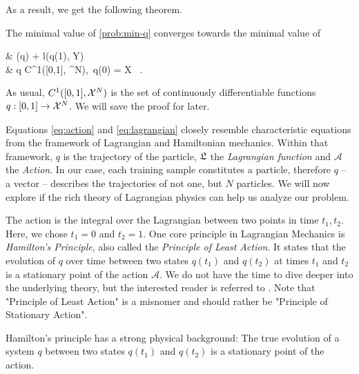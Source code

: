 As a result, we get the following theorem.
\begin{theorem}
	The minimal value of \cref{prob:min-q} converges towards the minimal value of             
	\begin{problem}
	\label{prob:cont-least-action}
		\begin{cases}
			 & \nu {}(q) + l(q(1), Y)\\
			 & q \in C^1([0,1], \cX^N),\ q(0) = X \ .
		\end{cases}
	\end{problem}
\end{theorem}
As usual, $C^1([0,1], \mathcal{X}^N)$ is the set of continuously differentiable functions $q: [0, 1] \rightarrow \mathcal{X}^N$.
We will save the proof for later.

Equations \ref{eq:action} and \ref{eq:lagrangian} closely resemble characteristic equations from the framework of Lagrangian and Hamiltonian mechanics.
Within that framework, $q$ is the trajectory of the particle, $\mathfrak{L}$ the \emph{Lagrangian function} and $\mathcal{A}$ the \emph{Action}.
In our case, each training sample constitutes a particle, therefore $q$ -- a vector -- describes the trajectories of not one, but $N$ particles.
We will now explore if the rich theory of Lagrangian physics can help us analyze our problem.

The action is the integral over the Lagrangian between two points in time $t_1, t_2$.
Here, we chose $t_1 = 0$ and $t_2 = 1$.
One core principle in Lagrangian Mechanics is \emph{Hamilton's Principle}, also called the \emph{Principle of Least Action}.
It states that
the evolution of $q$ over time between two states $q(t_1)$ and $q(t_2)$ at times $t_1$ and $t_2$ is a stationary point of the action $\mathcal{A}$.
We do not have the time to dive deeper into the underlying theory, but the interested reader is referred to .
Note that "Principle of Least Action" is a misnomer and should rather be "Principle of Stationary Action".


Hamilton's principle has a strong physical background:
The true evolution of a system $q$ between two states $q(t_1)$ and $q(t_2)$ is a stationary point of the action.

